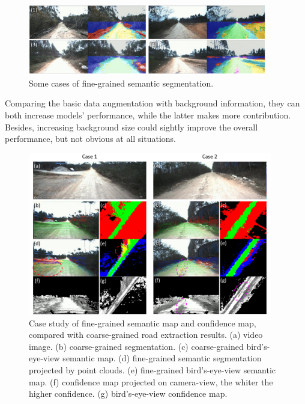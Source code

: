 \documentclass[letterpaper, 10 pt, conference]{ieeeconf}  %
\begin{document}
\begin{figure}[]
	\centering
	\includegraphics[width=0.93\textwidth]{semantic_segmentation.pdf}
	\caption{Some cases of fine-grained semantic segmentation.}
	\label{fig:semantic_segmentation}
\end{figure}

Comparing the basic data augmentation with background information, they can both increase models' performance, while the latter makes more contribution. Besides, increasing background size could sightly improve the overall performance, but not obvious at all situations.

\begin{figure}[]
	\centering
	\includegraphics[width=0.95\textwidth]{semantic_mapping.pdf}
	\caption{Case study of fine-grained semantic map and confidence map, compared with coarse-grained road extraction results. (a) video image. (b) coarse-grained segmentation. (c) coarse-grained bird's-eye-view semantic map. (d) fine-grained semantic segmentation projected by point clouds. (e) fine-grained bird's-eye-view semantic map. (f) confidence map projected on camera-view, the whiter the higher confidence. (g) bird's-eye-view confidence map.}
	\label{fig:semantic_mapping}
	\vspace{-4mm}
\end{figure}
\end{document}
